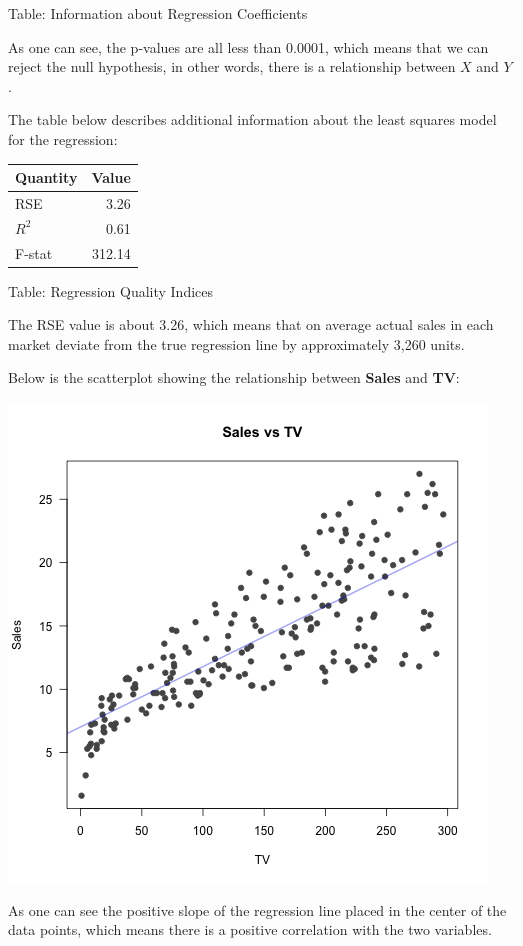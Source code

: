 \documentclass{article}
\begin{document}
Table: Information about Regression Coefficients

As one can see, the p-values are all less than 0.0001, which means that we can reject the null hypothesis, in other words, there is a relationship between $X$ and 
$Y$.

The table below describes additional information about the least squares model for the regression:

\begin{tabular}{|l|r|} \hline
\bf Quantity  & Value  \\\hline
    RSE       & 3.26   \\
    $R^2$     & 0.61   \\
    F-stat    & 312.14 \\\hline
\end{tabular}

Table: Regression Quality Indices

The RSE value is about 3.26, which means that on average actual sales in each market deviate from the true regression line by approximately 3,260 units. 

Below is the scatterplot showing the relationship between \textbf{Sales} and \textbf{TV}:

\includegraphics{images/scatterplot}

As one can see the positive slope of the regression line placed in the center of the data points, which means there is a positive correlation with the two variables.  
\end{document}
